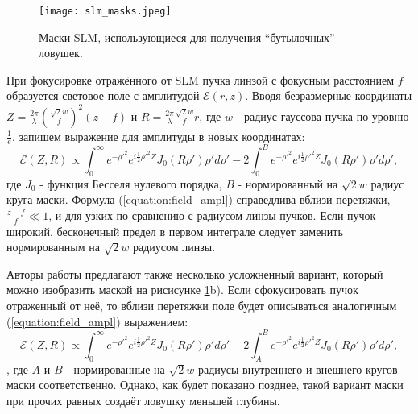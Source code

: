 \documentclass[12pt]{article}
\begin{document}
        \begin{figure}
            \center
            \texttt{[image: slm\_masks.jpeg]}
            \caption{Маски SLM, использующиеся для получения \enquote{бутылочных} ловушек.}
            \label{fig:SLM_masks}
        \end{figure}

        При фокусировке отражённого от SLM пучка линзой с фокусным расстоянием $f$ образуется
        световое поле с амплитудой $\mathcal{E}(r,z)$. Вводя безразмерные координаты
        $Z = \frac{2\pi}{\lambda}\left(\frac{\sqrt2w}{f}\right)^2(z - f)$ и
        $R = \frac{2\pi}{\lambda}\frac{\sqrt2w}{f}r$, где $w$ - радиус гауссова пучка по уровню
        $\frac1e$, запишем выражение для амплитуды в новых координатах:
        \begin{equation}
            \mathcal{E}(Z, R) \propto \int_0^\infty e^{-\rho'^2}e^{i\frac12\rho'^2Z}
                J_0(R\rho')\rho'd\rho' - 
                2\int_0^B e^{-\rho'^2}e^{i\frac12\rho'^2Z}
                J_0(R\rho')\rho'd\rho',
            \label{equation:field_ampl}
        \end{equation}
        где $J_0$ - функция Бесселя нулевого порядка, $B$ - нормированный на $\sqrt2w$
        радиус круга маски. Формула (\ref{equation:field_ampl}) справедлива вблизи перетяжки,
        $\frac{z - f}{f} \ll 1$, и для узких по сравнению с радиусом линзы пучков. Если пучок
        широкий, бесконечный предел в первом интеграле следует заменить нормированным на $\sqrt2w$
        радиусом линзы.

        \vspace{12pt}

        Авторы работы\cite{jian2002generations} предлагают также несколько усложненный вариант, который
        можно изобразить маской на рисисунке \ref{fig:SLM_masks}b). Если
        сфокусировать пучок отраженный от неё, то вблизи перетяжки поле будет описываться
        аналогичным (\ref{equation:field_ampl}) выражением:
        \begin{equation}
            \mathcal{E}(Z, R) \propto \int_0^\infty e^{-\rho'^2}e^{i\frac12\rho'^2Z}
                J_0(R\rho')\rho'd\rho' - 
                2\int_A^B e^{-\rho'^2}e^{i\frac12\rho'^2Z}
                J_0(R\rho')\rho'd\rho',
            \label{equation:field_ampl_improved}
        \end{equation}
        , где $A$ и $B$ - нормированные на $\sqrt2w$ радиусы внутреннего и внешнего кругов маски соответственно.
        Однако, как будет показано позднее, такой вариант маски при прочих равных создаёт ловушку меньшей глубины.
\end{document}
